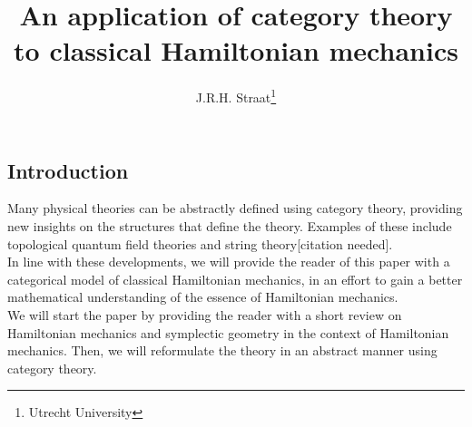 \documentclass{article}
\title{An application of category theory to classical Hamiltonian mechanics}
\author{J.R.H. Straat\thanks{Utrecht University}}%
\date{}
\begin{document}
\maketitle

\begin{multicols}{2}
	\section{Introduction}
	Many physical theories can be abstractly defined using category theory, providing new insights on the structures that define the theory. Examples of these include topological quantum field theories\cite{BaezTQFT} and string theory[citation needed].\\%
	In line with these developments, we will provide the reader of this paper with a categorical model of classical Hamiltonian mechanics, in an effort to gain a better mathematical understanding of the essence of Hamiltonian mechanics.\\
	We will start the paper by providing the reader with a short review on Hamiltonian mechanics and symplectic geometry in the context of Hamiltonian mechanics. Then, we will reformulate the theory in an abstract manner using category theory.

\end{multicols}
\end{document}
